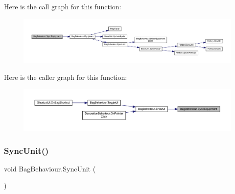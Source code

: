 Here is the call graph for this function\+:
\nopagebreak
\begin{figure}[H]
\begin{center}
\leavevmode
\includegraphics[width=350pt]{class_bag_behaviour_ab7a8add6e04a204513a05f0d312df676_cgraph}
\end{center}
\end{figure}
Here is the caller graph for this function\+:
\nopagebreak
\begin{figure}[H]
\begin{center}
\leavevmode
\includegraphics[width=350pt]{class_bag_behaviour_ab7a8add6e04a204513a05f0d312df676_icgraph}
\end{center}
\end{figure}
\mbox{\label{class_bag_behaviour_a1ab1c5f24022bf503ad3d3a18387515f}} 
\subsubsection{\texorpdfstring{SyncUnit()}{SyncUnit()}}
{\footnotesize\ttfamily void Bag\+Behaviour.\+Sync\+Unit (\begin{DoxyParamCaption}{ }\end{DoxyParamCaption})}


